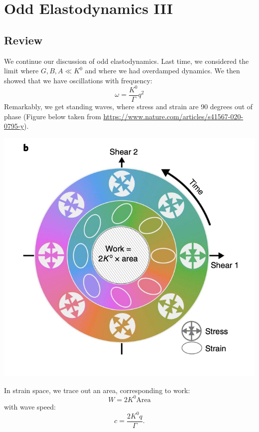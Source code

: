 \section{Odd Elastodynamics III}

\subsection{Review}
We continue our discussion of odd elastodynamics. Last time, we considered the limit where $G, B, A \ll K^0$ and where we had overdamped dynamics. We then showed that we have oscillations with frequency:
\begin{equation}
    \omega = \frac{K^0}{\Gamma}q^2
\end{equation}
Remarkably, we get standing waves, where stress and strain are 90 degrees out of phase (Figure below taken from \url{https://www.nature.com/articles/s41567-020-0795-y}).

\begin{center}
    \includegraphics[scale=0.5]{Lectures/Images/lec6-oddelasticwave.png}
\end{center}

In strain space, we trace out an area, corresponding to work:
\begin{equation}
    W = 2K^0 \text{Area}
\end{equation}
with wave speed:
\begin{equation}
    c = \frac{2K^0q}{\Gamma}.
\end{equation}

